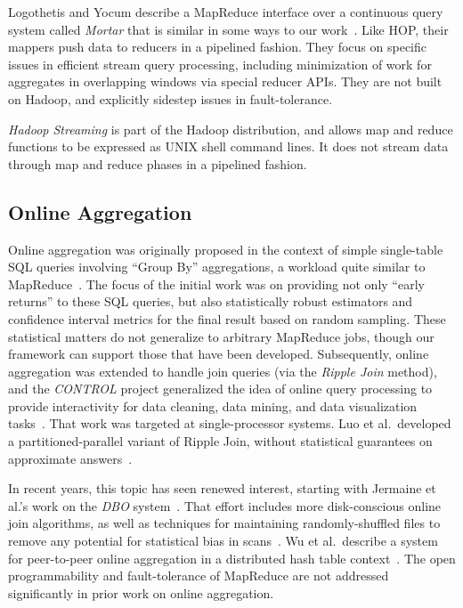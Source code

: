 Logothetis and Yocum describe a MapReduce interface over a continuous query
system called {\em Mortar} that is similar in some ways to our
work~\cite{logoyocum08}.  Like HOP, their mappers push data to reducers in a
pipelined fashion.  They focus on specific issues in efficient stream query
processing, including minimization of work for aggregates in overlapping
windows via special reducer APIs.  They are not built on Hadoop, and explicitly
sidestep issues in fault-tolerance.

{\em Hadoop Streaming} is part of the Hadoop distribution, and allows map and
reduce functions to be expressed as UNIX shell command lines.  It does not
stream data through map and reduce phases in a pipelined fashion.

\subsection{Online Aggregation}

Online aggregation was originally proposed in the context of simple
single-table SQL queries involving ``Group By'' aggregations, a workload quite
similar to MapReduce~\cite{onlineagg}.  The focus of the initial work was on
providing not only ``early returns'' to these SQL queries, but also
statistically robust estimators and confidence interval metrics for the final
result based on random sampling.  These statistical matters do not generalize
to arbitrary MapReduce jobs, though our framework can support those that have
been developed.  Subsequently, online aggregation was extended to handle join
queries (via the {\em Ripple Join} method), and the {\em CONTROL} project
generalized the idea of online query processing to provide interactivity for
data cleaning, data mining, and data visualization tasks~\cite{ieeecontrol}.
That work was targeted at single-processor systems.  Luo et al.\ developed a
partitioned-parallel variant of Ripple Join, without statistical guarantees on
approximate answers~\cite{luo-ripple}.

In recent years, this topic has seen renewed interest, starting with Jermaine
et al.'s work on the {\em DBO} system~\cite{dbo}.  That effort includes more
disk-conscious online join algorithms, as well as techniques for maintaining
randomly-shuffled files to remove any potential for statistical bias in
scans~\cite{jermaine-shuffle}.  Wu et al.\ describe a system for peer-to-peer
online aggregation in a distributed hash table context~\cite{wu-vldb09}.  The
open programmability and fault-tolerance of MapReduce are not addressed
significantly in prior work on online aggregation.

